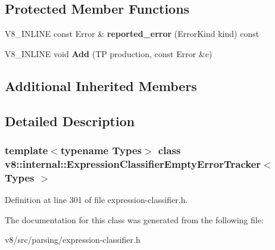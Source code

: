 \subsection*{Protected Member Functions}
\begin{DoxyCompactItemize}
\item 
\mbox{\label{classv8_1_1internal_1_1ExpressionClassifierEmptyErrorTracker_aad423cb2712d06085694f49fca4db54b}} 
V8\+\_\+\+I\+N\+L\+I\+NE const Error \& {\bfseries reported\+\_\+error} (Error\+Kind kind) const
\item 
\mbox{\label{classv8_1_1internal_1_1ExpressionClassifierEmptyErrorTracker_af103f7c4823fd1c4f5333305d4a4e8c2}} 
V8\+\_\+\+I\+N\+L\+I\+NE void {\bfseries Add} (TP production, const Error \&e)
\end{DoxyCompactItemize}
\subsection*{Additional Inherited Members}


\subsection{Detailed Description}
\subsubsection*{template$<$typename Types$>$\newline
class v8\+::internal\+::\+Expression\+Classifier\+Empty\+Error\+Tracker$<$ Types $>$}



Definition at line 301 of file expression-\/classifier.\+h.



The documentation for this class was generated from the following file\+:\begin{DoxyCompactItemize}
\item 
v8/src/parsing/expression-\/classifier.\+h\end{DoxyCompactItemize}
